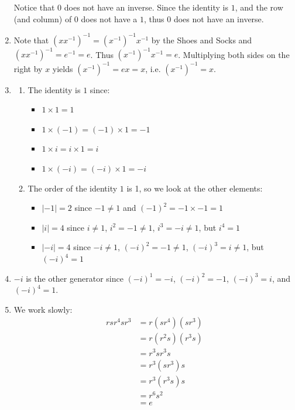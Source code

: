 \begin{enumerate}
    Notice that $0$ does not have an inverse. Since the identity is $1$, and the row (and column) of 0 does not have a $1$, thus $0$ does not have an inverse.
    \item Note that $(xx^{-1})^{-1} = (x^{-1})^{-1}x^{-1}$ by the Shoes and Socks and $(xx^{-1})^{-1} = e^{-1} = e$. Thus $(x^{-1})^{-1}x^{-1} = e$. Multiplying both sides on the right by $x$ yields $(x^{-1})^{-1} = ex = x$, i.e. $(x^{-1})^{-1} = x$.
    \item \begin{enumerate}[label=(\roman*)]
        \item The identity is $1$ since:
        \begin{itemize}
            \item $1 \times 1 = 1$
            \item $1 \times (-1) = (-1) \times 1 = -1$
            \item $1 \times i = i \times 1 = i$
            \item $1 \times (-i) = (-i) \times 1 = -i$
        \end{itemize}
        \item The order of the identity $1$ is 1, so we look at the other elements:
        \begin{itemize}
            \item $|-1| = 2$ since $-1 \neq 1$ and $(-1)^2 = -1 \times -1 = 1$
            \item $|i| = 4$ since $i \neq 1$, $i^2 = -1 \neq 1$, $i^3 = -i \neq 1$, but $i^4 = 1$
            \item $|-i| = 4$ since $-i \neq 1$, $(-i)^2 = -1 \neq 1$, $(-i)^3 = i \neq 1$, but $(-i)^4 = 1$
        \end{itemize}
    \end{enumerate}

    \item $-i$ is the other generator since $(-i)^1 = -i$, $(-i)^2 = -1$, $(-i)^3 = i$, and $(-i)^4 = 1$.

    \item We work slowly:
    \begin{align*}
        rsr^4sr^3 &= r(sr^4)(sr^3)\\
        &= r(r^2s)(r^3s)\\
        &= r^3sr^3s\\
        &= r^3(sr^3)s\\
        &= r^3(r^3s)s\\
        &= r^6s^2\\
        &= e
    \end{align*}
\end{enumerate}

